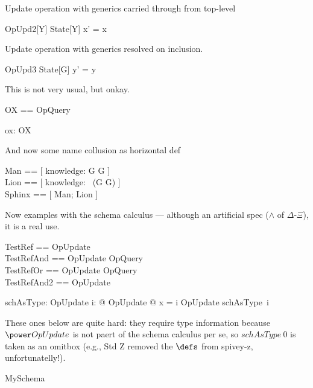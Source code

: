 \documentclass{article}
\begin{document}
Update operation with generics carried through from top-level
\begin{schema}{OpUpd2}[Y]
   \Delta State[Y]
\where
    x' = x 
\end{schema}

Update operation with generics resolved on inclusion.
\begin{schema}{OpUpd3}
   \Delta State[G]
\where
    y' = y 
\end{schema}

This is not very usual, but onkay.
\begin{zed}
   OX == \pre OpQuery
\end{zed}

\begin{axdef}
   ox: OX
\end{axdef}

And now some name collusion as horizontal def
\begin{zed} 
   Man  == [ knowledge: G \fun G ] \\
   Lion == [ knowledge: \power~(G \cross G) ] \\
   Sphinx == [ Man; Lion ]
\end{zed}

Now examples with the schema calculus --- although an artificial spec ($\land$ of $\Delta$-$\Xi$), it is a real use.
\begin{zed}
   TestRef     == OpUpdate \\
   TestRefAnd  == OpUpdate \land OpQuery \\
   TestRefOr   == OpUpdate \lor OpQuery \\
   TestRefAnd2 == OpUpdate \land [ v: \nat ]
\end{zed}

\begin{axdef}
   schAsType: \nat \fun \power OpUpdate
\where
   \forall i: \nat @ \exists OpUpdate @ x = i \land \theta OpUpdate \in schAsType~i 
\end{axdef}

These ones below are quite hard: they require type information because $\power OpUpdate$ 
is not paert of the schema calculus per se, so $schAsType~0$ is taken as an omitbox
(e.g., Std Z removed the $\defs$ from spivey-z, unfortunatelly!).
%

\begin{zed}
   MySchema 
\end{zed}
\end{document}
